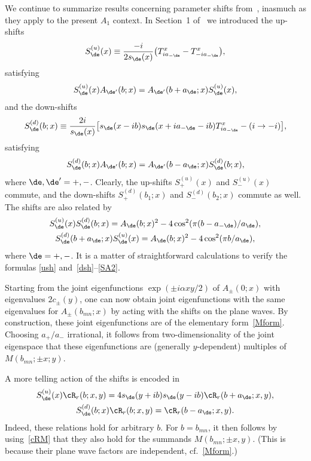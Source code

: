 \documentclass[pdftex]{sigma}
\numberwithin{equation}{section}
\begin{document}
We continue to summarize results concerning parameter shifts from~\cite{anne}, inasmuch as they apply to the present $A_1$ context. In Section~1 of~\cite{anne} we introduced the up-shifts
\begin{gather}\label{Su}
S_{\de}^{(u)}(x)\equiv \frac{-i}{2s_{\de}(x)}\big(T^x_{ia_{-\de}}-T^x_{-ia_{-\de}}\big),
\end{gather}
satisfying
\begin{gather}\label{ush}
S_{\de}^{(u)}(x)A_{\de'}(b;x)=A_{\de'}(b+a_{\de};x)S_{\de}^{(u)}(x),
\end{gather}
and the down-shifts
\begin{gather}\label{Sd}
S_{\de}^{(d)}(b;x)\equiv \frac{2i}{s_{\de}(x)}\big[s_{\de}(x-ib)s_{\de}(x+ia_{-\de}-ib)
T^x_{ia_{-\de}}-(i\to -i)\big],
\end{gather}
satisfying
\begin{gather}\label{dsh}
S_{\de}^{(d)}(b;x)A_{\de'}(b;x)=A_{\de'}(b-a_{\de};x)S_{\de}^{(d)}(b;x),
\end{gather}
where $\de,\de'=+,-$. Clearly, the up-shifts $S_{+}^{(u)}(x)$ and $S_{-}^{(u)}(x)$ commute, and the down-shifts $S_{+}^{(d)}(b_1;x)$ and $S_{-}^{(d)}(b_2;x)$ commute as well. The shifts are also related by
\begin{gather}\label{SA1}
S_{\de}^{(u)}(x)S_{\de}^{(d)}(b;x)=A_{\de}(b;x)^2-4\cos^2(\pi(b-a_{-\de})/a_{\de}),
\\
\label{SA2}
S_{\de}^{(d)}(b+a_{\de};x)S_{\de}^{(u)}(x)=A_{\de}(b;x)^2-4\cos^2(\pi b/a_{\de}),
\end{gather}
where $\de=+,-$. It is a matter of straightforward calculations to verify the formulas \eqref{ush} and~\eqref{dsh}--\eqref{SA2}.

Starting from the joint eigenfunctions $\exp(\pm i\alpha xy/2)$ of $A_{\pm}(0;x)$ with eigenvalues $2c_{\pm}(y)$, one can now obtain joint eigenfunctions with the same eigenvalues for $A_{\pm}(b_{mn};x)$ by acting with the shifts on the plane waves. By construction, these joint eigenfunctions are of the elementary form~\eqref{Mform}. Choosing $a_{+}/a_{-}$ irrational, it follows from two-dimensionality of the joint eigenspace that these eigenfunctions are (generally $y$-dependent) multiples of $M(b_{mn};\pm x;y)$.

A more telling action of the shifts is encoded in
\begin{gather}\label{cRu}
S_{\de}^{(u)}(x)\cR_r(b;x,y)=4s_{\de}(y+ ib)s_{\de}(y-ib)\cR_r(b+a_{\de};x,y),
\\
\label{cRd}
S_{\de}^{(d)}(b;x)\cR_r(b;x,y)=\cR_r(b-a_{\de};x,y).
\end{gather}
Indeed, these relations hold for arbitrary $b$. For $b=b_{mn}$, it then follows by using~\eqref{cRM} that they also hold for the summands $M(b_{mn};\pm x,y)$. (This is because their plane wave factors are independent, cf.~\eqref{Mform}.)
\end{document}

